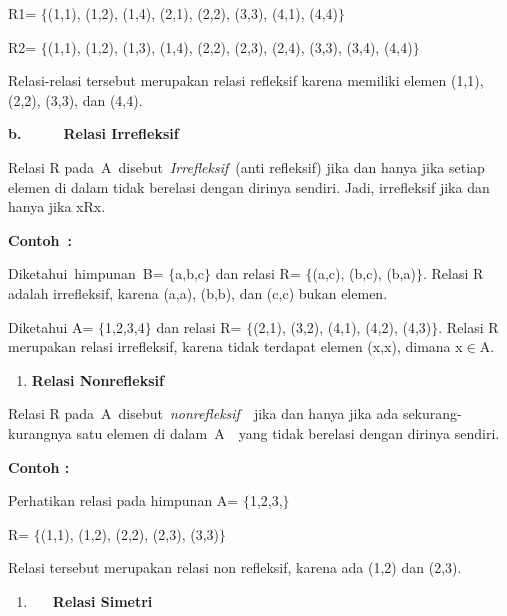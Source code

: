 \documentclass[11pt,fleqn]{book} %
\begin{document}
R1= $\{$(1,1), (1,2), (1,4), (2,1), (2,2), (3,3), (4,1), (4,4)$\}$

R2= $\{$(1,1), (1,2), (1,3), (1,4), (2,2), (2,3), (2,4), (3,3), (3,4), (4,4)$\}$



\noindent Relasi-relasi tersebut merupakan relasi refleksif karena memiliki elemen (1,1), (2,2), (3,3), dan (4,4).



\textbf{b.}~~~~~~\textbf{Relasi Irrefleksif}

\textbf{}

Relasi R pada~A~disebut~\textit{Irrefleksif}~(anti refleksif) jika dan hanya jika setiap elemen di dalam tidak berelasi dengan dirinya sendiri. Jadi, irrefleksif jika dan hanya jika xRx.

\textbf{Contoh~:}

\noindent 

\noindent Diketahui~himpunan~B= $\{$a,b,c$\}$ dan relasi R= $\{$(a,c), (b,c), (b,a)$\}$. Relasi R adalah irrefleksif, karena (a,a), (b,b), dan (c,c) bukan elemen.

\noindent 

\noindent Diketahui A= $\{$1,2,3,4$\}$ dan relasi R= $\{$(2,1), (3,2), (4,1), (4,2), (4,3)$\}$. Relasi R merupakan relasi irrefleksif, karena tidak terdapat elemen (x,x), dimana x$\mathrm{\in }$A.



\begin{enumerate}
\item  \textbf{Relasi Nonrefleksif}
\end{enumerate}

\noindent 

\noindent Relasi R pada~A~disebut~\textit{nonrefleksif}~~jika dan hanya jika ada sekurang-kurangnya satu elemen di dalam~A~~yang tidak berelasi dengan dirinya sendiri.

\noindent 

\noindent \textbf{Contoh :}

\noindent \textbf{}

\noindent Perhatikan relasi pada himpunan A= $\{$1,2,3,$\}$

\noindent R= $\{$(1,1), (1,2), (2,2), (2,3), (3,3)$\}$

\noindent Relasi tersebut merupakan relasi non refleksif, karena ada (1,2) dan (2,3).

\noindent 

\noindent 

\begin{enumerate}
\item  ~~~\textbf{Relasi Simetri}
\end{enumerate}
\end{document}
